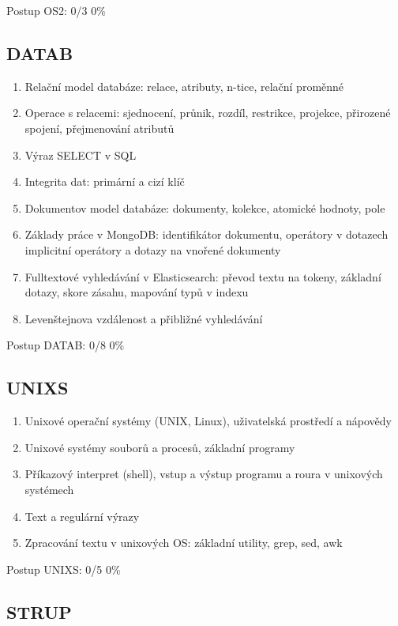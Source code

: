 \documentclass{article}
\begin{document}
	Postup OS2: 0/3 0\%
	
	\subsection*{DATAB}
	
	\begin{enumerate}[label=\arabic*.]
		\item Relační model databáze: relace, atributy, n-tice, relační proměnné
		\item Operace s relacemi: sjednocení, průnik, rozdíl, restrikce, projekce, přirozené spojení, přejmenování atributů
		\item Výraz SELECT v SQL
		\item Integrita dat: primární a cizí klíč
		\item Dokumentov model databáze: dokumenty, kolekce, atomické hodnoty, pole
		\item Základy práce v MongoDB: identifikátor dokumentu, operátory v dotazech implicitní operátory a dotazy na vnořené dokumenty
		\item Fulltextové vyhledávání v Elasticsearch: převod textu na tokeny, základní dotazy, skore zásahu, mapování typů v indexu
		\item Levenštejnova vzdálenost a přibližné vyhledávání
	\end{enumerate}
	
	Postup DATAB: 0/8 0\%
	
	\subsection*{UNIXS}
	
	\begin{enumerate}[label=\arabic*.]
		\item Unixové operační systémy (UNIX, Linux), uživatelská prostředí a nápovědy
		\item Unixové systémy souborů a procesů, základní programy
		\item Příkazový interpret (shell), vstup a výstup programu a roura v unixových systémech
		\item Text a regulární výrazy
		\item Zpracování textu v unixových OS: základní utility, grep, sed, awk
	\end{enumerate}
	
	Postup UNIXS: 0/5 0\%
	
	\subsection*{STRUP}
	
\end{document}
